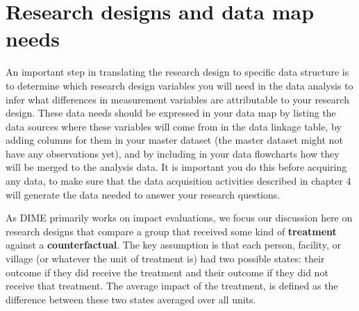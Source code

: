 \section{Research designs and data map needs}

An important step in translating the research design to specific data 
structure is to determine which research design variables you will need in the data analysis
to infer what differences in measurement variables
are attributable to your research design.
These data needs should be expressed in your data map by
listing the data sources where these variables will come from in the data linkage table,
by adding columns for them in your master dataset
(the master dataset might not have any observations yet),
and by including in your data flowcharts how they will be merged to the analysis data.
It is important you do this before acquiring any data,
to make sure that the data acquisition activities described in chapter 4
will generate the data needed to answer your research questions.

As DIME primarily works on impact evaluations,
we focus our discussion here on research designs
that compare a group that received
some kind of \textbf{treatment}
against a \textbf{counterfactual}.
The key assumption is that each
person, facility, or village
(or whatever the unit of treatment is)
had two possible states: their outcome if they did receive the treatment
and their outcome if they did not receive that treatment.
The average impact of the treatment,
is defined as the difference
between these two states averaged over all units.

